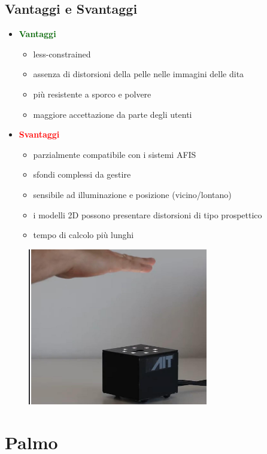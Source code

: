 \documentclass{report}
\begin{document}
\newpage
\section{Vantaggi e Svantaggi}

\begin{itemize}
    \item \textcolor{darkgreen}{\textbf{Vantaggi}}
    \begin{itemize}
        \item less-constrained
        \item assenza di distorsioni della pelle nelle immagini delle dita 
        \item più resistente a sporco e polvere 
        \item maggiore accettazione da parte degli utenti
    \end{itemize}
    \item \textcolor{red}{\textbf{Svantaggi}}
    \begin{itemize}
        \item parzialmente compatibile con i sistemi AFIS
        \item sfondi complessi da gestire 
        \item sensibile ad illuminazione e posizione (vicino/lontano)
        \item i modelli 2D possono presentare distorsioni di tipo prospettico
        \item tempo di calcolo più lunghi
    \end{itemize}
\end{itemize}

\begin{figure}[ht]
    \centering
    \includegraphics[width=0.6\linewidth]{images/finger.png}
\end{figure}

\chapter{Palmo}
\end{document}
